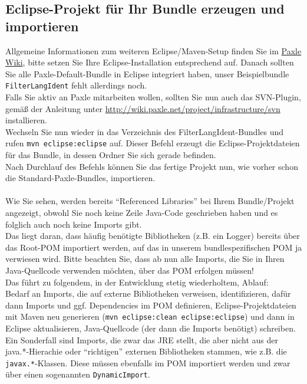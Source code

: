 \documentclass[a4paper,12pt]{scrartcl}
\begin{document}
\subsection{Eclipse-Projekt für Ihr Bundle erzeugen und importieren}
Allgemeine Informationen zum weiteren Eclipse/Maven-Setup finden Sie im \href{http://wiki.paxle.net/dev/build/maven}{Paxle Wiki}, bitte setzen Sie Ihre Eclipse-Installation entsprechend auf. Danach sollten Sie alle Paxle-Default-Bundle in Eclipse integriert haben, unser Beispielbundle \lstinline[breaklines=false, basicstyle=\itshape]|FilterLangIdent| fehlt allerdings noch.\\
Falls Sie aktiv an Paxle mitarbeiten wollen, sollten Sie nun auch das SVN-Plugin, gemäß der Anleitung unter \href{http://wiki.paxle.net/project/infrastructure/svn}{http://wiki.paxle.net/project/infrastructure/svn} installieren.\\
Wechseln Sie nun wieder in das Verzeichnis des FilterLangIdent-Bundles und rufen \lstinline[breaklines=false, basicstyle=\itshape]|mvn eclipse:eclipse| auf. Dieser Befehl erzeugt die Eclipse-Projektdateien für das Bundle, in dessen Ordner Sie sich gerade befinden.\\
Nach Durchlauf des Befehls können Sie das fertige Projekt nun, wie vorher schon die Standard-Paxle-Bundles, importieren.\\
\\
Wie Sie sehen, werden bereits "`Referenced Libraries"' bei Ihrem Bundle/Projekt angezeigt, obwohl Sie noch keine Zeile Java-Code geschrieben haben und es folglich auch noch keine Imports gibt.\\
Das liegt daran, dass häufig benötigte Bibliotheken (z.B. ein Logger) bereits über das Root-POM importiert werden, auf das in unserem bundlespezifischen POM ja verwiesen wird. Bitte beachten Sie, dass ab nun alle Imports, die Sie in Ihren Java-Quellcode verwenden möchten, über das POM erfolgen müssen!\\
Das führt zu folgendem, in der Entwicklung stetig wiederholtem, Ablauf:\\
Bedarf an Imports, die auf externe Bibliotheken verweisen, identifizieren, dafür dann Imports und ggf. Dependencies im POM definieren, Eclipse-Projektdateien mit Maven neu generieren (\lstinline[breaklines=false, basicstyle=\itshape]|mvn eclipse:clean eclipse:eclipse|) und dann in Eclipse aktualisieren, Java-Quellcode (der dann die Imports benötigt) schreiben.\\
Ein Sonderfall sind Imports, die zwar das JRE stellt, die aber nicht aus der java.*-Hierachie oder "`richtigen"' externen Bibliotheken stammen, wie z.B. die \lstinline[breaklines=false, basicstyle=\itshape]|javax.*|-Klassen. Diese müssen ebenfalls im POM importiert werden und zwar über einen sogenannten \lstinline[breaklines=false, basicstyle=\itshape]|DynamicImport|.
\end{document}
